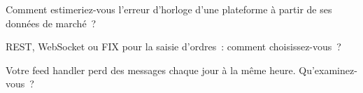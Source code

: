 \begin{interviewq}\label{iq:nw:api-engineering-for-crypto-venues:4}
Comment estimeriez-vous l'erreur d'horloge d'une plateforme à partir de ses données de marché~?
\end{interviewq}

\begin{interviewq}\label{iq:nw:api-engineering-for-crypto-venues:5}
REST, WebSocket ou FIX pour la saisie d'ordres~: comment choisissez-vous~?
\end{interviewq}

\begin{interviewq}\label{iq:nw:api-engineering-for-crypto-venues:6}
Votre feed handler perd des messages chaque jour à la même heure. Qu'examinez-vous~?
\end{interviewq}
